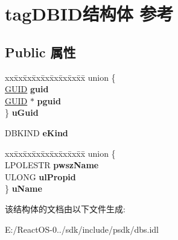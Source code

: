 \hypertarget{structtag_d_b_i_d}{}\section{tag\+D\+B\+I\+D结构体 参考}
\label{structtag_d_b_i_d}
\subsection*{Public 属性}
\begin{DoxyCompactItemize}
\item 
\mbox{\label{structtag_d_b_i_d_afccb6bb938c13be43da7d64e42276daa}} 
\begin{tabbing}
xx\=xx\=xx\=xx\=xx\=xx\=xx\=xx\=xx\=\kill
union \{\\
\>\hyperlink{interface_g_u_i_d}{GUID} {\bfseries guid}\\
\>\hyperlink{interface_g_u_i_d}{GUID} $\ast$ {\bfseries pguid}\\
\} {\bfseries uGuid}\\

\end{tabbing}\item 
\mbox{\label{structtag_d_b_i_d_ad01c85c6bb0c32bccd7a80b7321e970c}} 
D\+B\+K\+I\+ND {\bfseries e\+Kind}
\item 
\mbox{\label{structtag_d_b_i_d_aa4e7c196cfdf8900091d5d0ac9859403}} 
\begin{tabbing}
xx\=xx\=xx\=xx\=xx\=xx\=xx\=xx\=xx\=\kill
union \{\\
\>LPOLESTR {\bfseries pwszName}\\
\>ULONG {\bfseries ulPropid}\\
\} {\bfseries uName}\\

\end{tabbing}\end{DoxyCompactItemize}


该结构体的文档由以下文件生成\+:\begin{DoxyCompactItemize}
\item 
E\+:/\+React\+O\+S-\/0../sdk/include/psdk/dbs.\+idl\end{DoxyCompactItemize}
